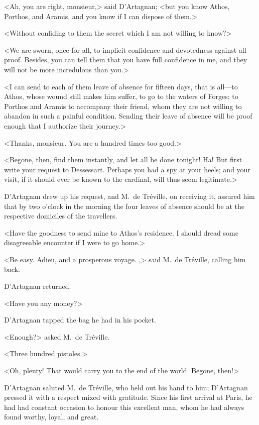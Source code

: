 <Ah, you are right, monsieur,> said D'Artagnan; <but you know Athos, Porthos, and Aramis, and you know if I can dispose of them.> 

<Without confiding to them the secret which I am not willing to know?> 

<We are sworn, once for all, to implicit confidence and devotedness against all proof. Besides, you can tell them that you have full confidence in me, and they will not be more incredulous than you.> 

<I can send to each of them leave of absence for fifteen days, that is all—to Athos, whose wound still makes him suffer, to go to the waters of Forges; to Porthos and Aramis to accompany their friend, whom they are not willing to abandon in such a painful condition. Sending their leave of absence will be proof enough that I authorize their journey.> 

<Thanks, monsieur. You are a hundred times too good.> 

<Begone, then, find them instantly, and let all be done tonight! Ha! But first write your request to Dessessart. Perhaps you had a spy at your heels; and your visit, if it should ever be known to the cardinal, will thus seem legitimate.> 

D'Artagnan drew up his request, and M.~de Tréville, on receiving it, assured him that by two o'clock in the morning the four leaves of absence should be at the respective domiciles of the travellers. 

<Have the goodness to send mine to Athos's residence. I should dread some disagreeable encounter if I were to go home.> 

<Be easy. Adieu, and a prosperous voyage. ,> said M.~de Tréville, calling him back. 

D'Artagnan returned. 

<Have you any money?> 

D'Artagnan tapped the bag he had in his pocket. 

<Enough?> asked M.~de Tréville. 

<Three hundred pistoles.> 

<Oh, plenty! That would carry you to the end of the world. Begone, then!> 

D'Artagnan saluted M.~de Tréville, who held out his hand to him; D'Artagnan pressed it with a respect mixed with gratitude. Since his first arrival at Paris, he had had constant occasion to honour this excellent man, whom he had always found worthy, loyal, and great. 

